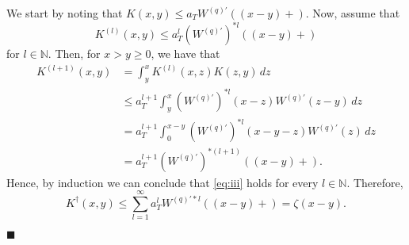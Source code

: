 \documentclass[12pt,reqno]{amsart}
\theoremstyle{definition}
\theoremstyle{remark}
\begin{document}
 We start by noting that
$K(x,y)\le a_T {W^{(q)\prime}}((x-y)+)$.
    Now,  assume that 
     \begin{equation}\label{eq:iii}  K^{(l)}(x,y)\le a_T^l{(W^{(q)\prime})^{*l}((x-y)+)}
     \end{equation}
       for $l\in\mathbb{N}$.
     Then, for $x> y\geq0$, we have that
     \begin{align*}
         K^{(l+1)}(x,y)&=\int_{y}^xK^{(l)}(x,z)K(z,y)\,dz\\
       &\le {a_T^{l+1}}\int_y^x(W^{(q)\prime})^{*l}(x-z){W^{(q)\prime}}(z-y)\,dz\\
       &= {
  a_T^{l+1}\int_0^{x-y}(W^{(q)\prime})^{*l}(x-y-z){W^{(q)\prime}}(z)\,dz}\\
&={a_T^{l+1}(W^{(q)\prime})^{*(l+1)}((x-y)+)}.
     \end{align*}
Hence, by induction we can conclude that \eqref{eq:iii} holds for every $l\in\mathbb{N}$. Therefore,
     $$K^{\dagger}(x,y)\le \sum_{l=1}^\infty a_T^lW^{(q)'*l}((x-y)+)=\zeta(x-y).$$

\begin{flushright}$\blacksquare$\end{flushright}
\end{document}
